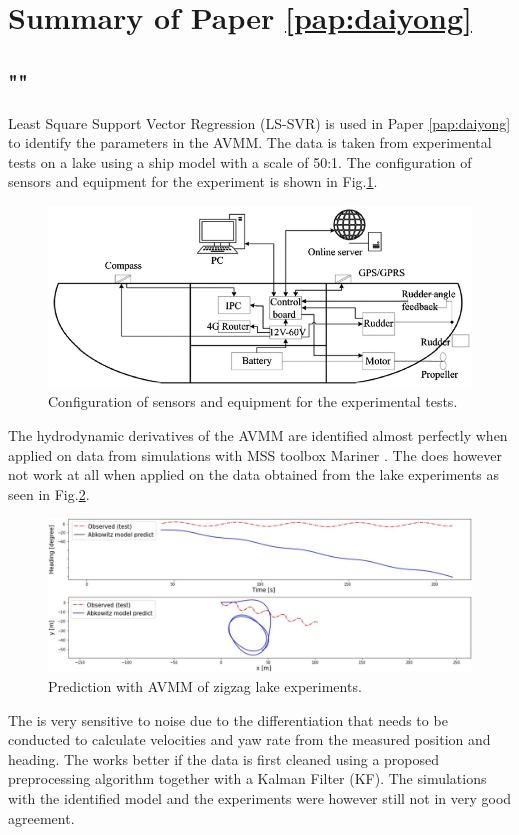 \section{Summary of Paper \ref{pap:daiyong}}
\subsection*{""}
Least Square Support Vector Regression (LS-SVR) \cite{brereton_support_2010} is used in Paper \ref{pap:daiyong} to identify the parameters in the AVMM.  
The data is taken from experimental tests on a lake using a ship model with a scale of 50:1. The configuration of sensors and equipment for the experiment is shown in Fig.\ref{fig:cthmodel}.  
\begin{figure}[H]
    \centering
    \includegraphics[width=\textwidth]{kappa/images/cth_model.png}
    \caption{Configuration of sensors and equipment for the experimental tests.}
    \label{fig:cthmodel}
\end{figure}
\noindent The hydrodynamic derivatives of the AVMM are identified almost perfectly when applied on data from simulations with MSS toolbox Mariner \cite{tristan_matlab_2009}. The  does however not work at all when applied on the data obtained from the lake experiments as seen in Fig.\ref{fig:daiyong_extrapolation}. 

\begin{figure}[H]
    \centering
    \includegraphics[width=\linewidth]{kappa/images/daiyong_extrapolation.jpeg}
    \caption{Prediction with AVMM of zigzag lake experiments.}
    \label{fig:daiyong_extrapolation}
\end{figure}

\noindent The  is very sensitive to noise due to the differentiation that needs to be conducted to calculate velocities and yaw rate from the measured position and heading. The  works better if the data is first cleaned using a proposed preprocessing algorithm together with a Kalman Filter (KF). The simulations with the identified model and the experiments were however still not in very good agreement.  